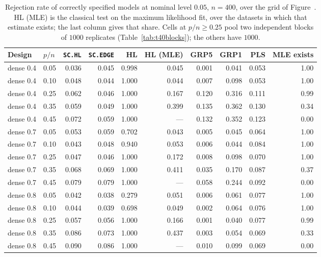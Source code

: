 \begin{table}[htbp]
\centering
\caption{Rejection rate of correctly specified models at nominal level $0.05$, $n = 400$, over the grid of Figure~. HL (MLE) is the classical test on the maximum likelihood fit, over the datasets in which that estimate exists; the last column gives that share. Cells at $p/n \ge 0.25$ pool two independent blocks of $1000$ replicates (Table~\ref{tab:t40blocks}); the others have $1000$.}
\label{tab:t40size}
\small
\setlength{\tabcolsep}{4pt}
\begin{tabular}{llrrrrrrrr}
\toprule
Design & $p/n$ & \texttt{SC.HL} & \texttt{SC.EDGE} & HL & HL (MLE) & GRP5 & GRP1 & PLS & MLE exists \\
\midrule
dense 0.4 & 0.05 & 0.036 & 0.045 & 0.998 & 0.045 & 0.001 & 0.041 & 0.053 & 1.00 \\
dense 0.4 & 0.10 & 0.048 & 0.044 & 1.000 & 0.044 & 0.007 & 0.098 & 0.053 & 1.00 \\
dense 0.4 & 0.25 & 0.062 & 0.046 & 1.000 & 0.167 & 0.120 & 0.316 & 0.111 & 0.99 \\
dense 0.4 & 0.35 & 0.059 & 0.049 & 1.000 & 0.399 & 0.135 & 0.362 & 0.130 & 0.34 \\
dense 0.4 & 0.45 & 0.072 & 0.059 & 1.000 & --- & 0.132 & 0.352 & 0.123 & 0.00 \\
\addlinespace
dense 0.7 & 0.05 & 0.053 & 0.059 & 0.702 & 0.043 & 0.005 & 0.045 & 0.064 & 1.00 \\
dense 0.7 & 0.10 & 0.043 & 0.048 & 0.940 & 0.053 & 0.006 & 0.044 & 0.084 & 1.00 \\
dense 0.7 & 0.25 & 0.047 & 0.046 & 1.000 & 0.172 & 0.008 & 0.098 & 0.070 & 1.00 \\
dense 0.7 & 0.35 & 0.068 & 0.069 & 1.000 & 0.411 & 0.035 & 0.170 & 0.087 & 0.37 \\
dense 0.7 & 0.45 & 0.079 & 0.079 & 1.000 & --- & 0.058 & 0.244 & 0.092 & 0.00 \\
\addlinespace
dense 0.8 & 0.05 & 0.042 & 0.038 & 0.279 & 0.051 & 0.006 & 0.061 & 0.077 & 1.00 \\
dense 0.8 & 0.10 & 0.044 & 0.039 & 0.698 & 0.049 & 0.002 & 0.064 & 0.076 & 1.00 \\
dense 0.8 & 0.25 & 0.057 & 0.056 & 1.000 & 0.166 & 0.001 & 0.040 & 0.077 & 0.99 \\
dense 0.8 & 0.35 & 0.086 & 0.073 & 1.000 & 0.437 & 0.003 & 0.054 & 0.069 & 0.33 \\
dense 0.8 & 0.45 & 0.090 & 0.086 & 1.000 & --- & 0.010 & 0.099 & 0.069 & 0.00 \\

\end{tabular}
\end{table}
